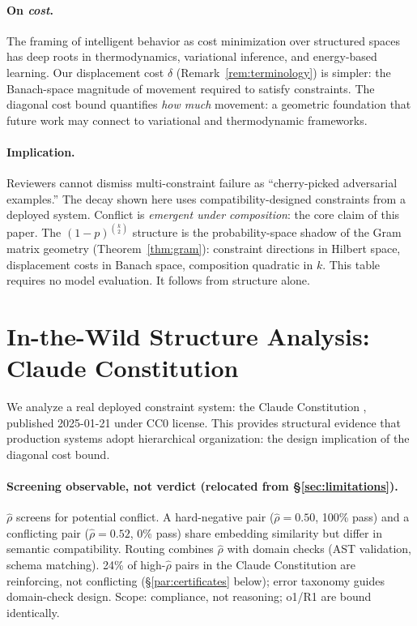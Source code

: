 \documentclass{article}
\theoremstyle{plain}
\theoremstyle{definition}
\theoremstyle{remark}
\newcommand{\rhohat}{\hat{\rho}}
\begin{document}
\paragraph{On \emph{cost}.} The framing of intelligent behavior as cost minimization over structured spaces has deep roots in thermodynamics, variational inference, and energy-based learning. Our displacement cost $\delta$ (Remark~\ref{rem:terminology}) is simpler: the Banach-space magnitude of movement required to satisfy constraints. The diagonal cost bound quantifies \emph{how much} movement: a geometric foundation that future work may connect to variational and thermodynamic frameworks.

\paragraph{Implication.} Reviewers cannot dismiss multi-constraint failure as ``cherry-picked adversarial examples.'' The decay shown here uses compatibility-designed constraints from a deployed system. Conflict is \emph{emergent under composition}: the core claim of this paper. The $(1-p)^{\binom{k}{2}}$ structure is the probability-space shadow of the Gram matrix geometry (Theorem~\ref{thm:gram}): constraint directions in Hilbert space, displacement costs in Banach space, composition quadratic in $k$. This table requires no model evaluation. It follows from structure alone.

\section{In-the-Wild Structure Analysis: Claude Constitution}\label{app:constitution}\hypertarget{lim:scope}{}

We analyze a real deployed constraint system: the Claude Constitution \citep{anthropic2025constitution}, published 2025-01-21 under CC0 license. This provides structural evidence that production systems adopt hierarchical organization: the design implication of the diagonal cost bound.

\paragraph{Screening observable, not verdict (relocated from \S\ref{sec:limitations}).}
$\rhohat$ screens for potential conflict. A hard-negative pair ($\rhohat{=}0.50$, 100\% pass) and a conflicting pair ($\rhohat{=}0.52$, 0\% pass) share embedding similarity but differ in semantic compatibility. Routing combines $\rhohat$ with domain checks (AST validation, schema matching). 24\% of high-$\rhohat$ pairs in the Claude Constitution are reinforcing, not conflicting (\S\ref{par:certificates} below); error taxonomy guides domain-check design. Scope: compliance, not reasoning; o1/R1 are bound identically.
\end{document}
